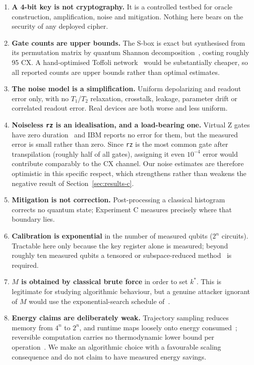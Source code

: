 \documentclass[11pt,a4paper]{article}
\begin{document}
\begin{enumerate}
  \item \textbf{A 4-bit key is not cryptography.} It is a controlled testbed for
        oracle construction, amplification, noise and mitigation. Nothing here
        bears on the security of any deployed cipher.
  \item \textbf{Gate counts are upper bounds.} The S-box is exact but
        synthesised from its permutation matrix by quantum Shannon
        decomposition~\citep{shende2006}, costing roughly 95 CX. A
        hand-optimised Toffoli network~\citep{barenco1995,amy2016} would be
        substantially cheaper, so all reported counts are upper bounds rather
        than optimal estimates.
  \item \textbf{The noise model is a simplification.} Uniform depolarizing and
        readout error only, with no $T_1$/$T_2$ relaxation, crosstalk, leakage,
        parameter drift or correlated readout error. Real devices are both worse
        and less uniform.
  \item \textbf{Noiseless \texttt{rz} is an idealisation, and a load-bearing
        one.} Virtual Z gates have zero duration~\citep{mckay2017} and IBM
        reports no error for them, but the measured error is small rather than
        zero. Since \texttt{rz} is the most common gate after transpilation
        (roughly half of all gates), assigning it even $10^{-4}$ error would
        contribute comparably to the CX channel. Our noise estimates are
        therefore optimistic in this specific respect, which strengthens rather
        than weakens the negative result of Section~\ref{sec:results-c}.
  \item \textbf{Mitigation is not correction.} Post-processing a classical
        histogram corrects no quantum state; Experiment C measures precisely
        where that boundary lies.
  \item \textbf{Calibration is exponential} in the number of measured qubits
        ($2^{n}$ circuits). Tractable here only because the key register alone
        is measured; beyond roughly ten measured qubits a tensored or
        subspace-reduced method~\citep{nation2021} is required.
  \item \textbf{$M$ is obtained by classical brute force} in order to set
        $k^\ast$. This is legitimate for studying algorithmic behaviour, but a
        genuine attacker ignorant of $M$ would use the exponential-search
        schedule of~\citet{boyer1998}.
  \item \textbf{Energy claims are deliberately weak.} Trajectory sampling
        reduces memory from $4^n$ to $2^n$, and runtime maps loosely onto energy
        consumed~\citep{lannelongue2021}; reversible computation carries no
        thermodynamic lower bound per
        operation~\citep{landauer1961,bennett1973}. We make an algorithmic
        choice with a favourable scaling consequence and do not claim to have
        measured energy savings.
\end{enumerate}
\end{document}
